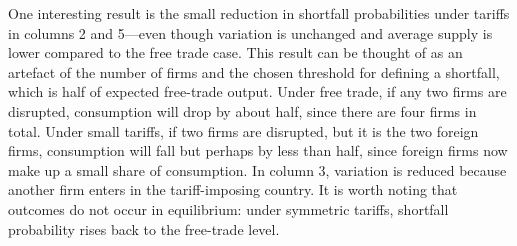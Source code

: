 \documentclass{article}
\begin{document}
One interesting result is the small reduction in shortfall probabilities under tariffs in columns 2 and 5---even though variation is unchanged and average supply is lower compared to the free trade case. This result can be thought of as an artefact of the number of firms and the chosen threshold for defining a shortfall, which is half of expected free-trade output. Under free trade, if any two firms are disrupted, consumption will drop by about half, since there are four firms in total. Under small tariffs, if two firms are disrupted, but it is the two foreign firms, consumption will fall but perhaps by less than half, since foreign firms now make up a small share of consumption. In column 3, variation is reduced because another firm enters in the tariff-imposing country. It is worth noting that outcomes do not occur in equilibrium: under symmetric tariffs, shortfall probability rises back to the free-trade level.
\end{document}
